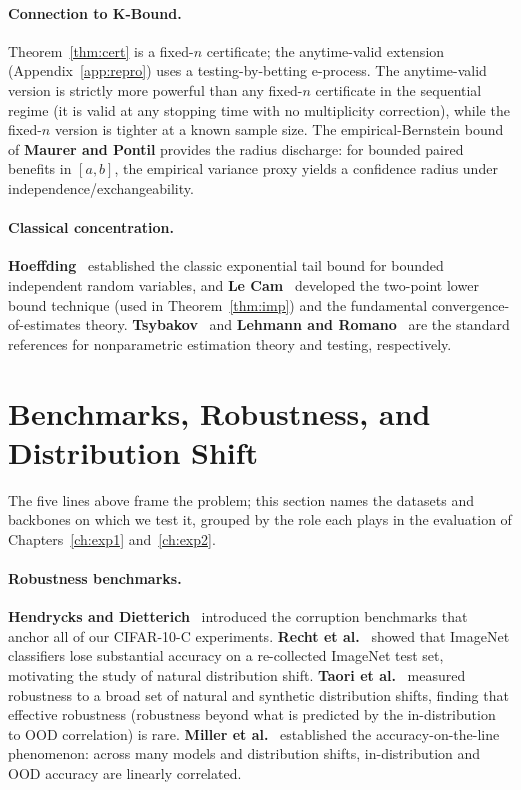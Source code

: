 \paragraph{Connection to K-Bound.}
Theorem~\ref{thm:cert} is a fixed-$n$ certificate; the anytime-valid
extension (Appendix~\ref{app:repro}) uses a testing-by-betting e-process.
The anytime-valid version is strictly more powerful than any fixed-$n$
certificate in the sequential regime (it is valid at any stopping time with
no multiplicity correction), while the fixed-$n$ version is tighter at a
known sample size.
The empirical-Bernstein bound of \textbf{Maurer and Pontil}
\cite{maurer2009empirical} provides the radius discharge: for bounded
paired benefits in $[a,b]$, the empirical variance proxy yields a confidence
radius under independence/exchangeability.

\paragraph{Classical concentration.}
\textbf{Hoeffding}~\cite{hoeffding1963probability} established the classic
exponential tail bound for bounded independent random variables, and
\textbf{Le Cam}~\cite{lecam1973convergence} developed the two-point lower
bound technique (used in Theorem~\ref{thm:imp}) and the fundamental
convergence-of-estimates theory.
\textbf{Tsybakov}~\cite{tsybakov2009introduction} and
\textbf{Lehmann and Romano}~\cite{lehmann2005testing} are the standard
references for nonparametric estimation theory and testing, respectively.

\section{Benchmarks, Robustness, and Distribution Shift}\label{sec:rel-bench}

The five lines above frame the problem; this section names the datasets and
backbones on which we test it, grouped by the role each plays in the evaluation
of Chapters~\ref{ch:exp1} and~\ref{ch:exp2}.

\paragraph{Robustness benchmarks.}
\textbf{Hendrycks and Dietterich}~\cite{hendrycks2019benchmarking} introduced
the corruption benchmarks that anchor all of our CIFAR-10-C experiments.
\textbf{Recht et al.}~\cite{recht2019imagenet} showed that ImageNet classifiers
lose substantial accuracy on a re-collected ImageNet test set, motivating the
study of natural distribution shift.
\textbf{Taori et al.}~\cite{taori2020measuring} measured robustness to a broad
set of natural and synthetic distribution shifts, finding that effective
robustness (robustness beyond what is predicted by the in-distribution to
OOD correlation) is rare.
\textbf{Miller et al.}~\cite{miller2021accuracy} established the accuracy-on-the-line
phenomenon: across many models and distribution shifts, in-distribution and
OOD accuracy are linearly correlated.

